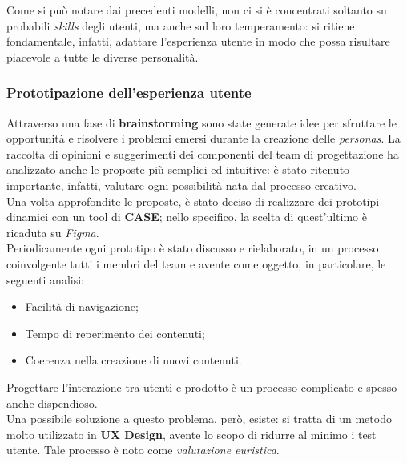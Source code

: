 \documentclass{natourDoc}
\begin{document}
Come si può notare dai precedenti modelli, non ci si è concentrati soltanto su probabili \textit{skills} degli utenti, ma anche sul loro 
temperamento: si ritiene fondamentale, infatti, adattare l'esperienza utente in modo che possa risultare piacevole a tutte le diverse personalità.

\newpage
\subsubsection{Prototipazione dell'esperienza utente}
Attraverso una fase di \textbf{brainstorming} sono state generate idee per sfruttare le opportunità e risolvere i problemi emersi durante la creazione delle \textit{personas}.
La raccolta di opinioni e suggerimenti dei componenti del team di progettazione ha analizzato anche le proposte più semplici ed intuitive: è stato ritenuto importante, infatti, valutare ogni 
possibilità nata dal processo creativo. \\
Una volta approfondite le proposte, è stato deciso di realizzare dei prototipi dinamici con un tool di \textbf{CASE}; nello specifico, la scelta di quest'ultimo è ricaduta su \textit{Figma}.\\

Periodicamente ogni prototipo è stato discusso e rielaborato, in un processo coinvolgente tutti i membri del team e avente come oggetto, in particolare, le seguenti analisi:
\begin{itemize}
	\item Facilità di navigazione;
	\item Tempo di reperimento dei contenuti;
	\item Coerenza nella creazione di nuovi contenuti.
\end{itemize}

Progettare l'interazione tra utenti e prodotto è un processo complicato e spesso anche dispendioso. \\
Una possibile soluzione a questo problema, però, esiste: si tratta di un metodo molto utilizzato in 
\textbf{UX Design}, avente lo scopo di ridurre al minimo i test utente. Tale processo è noto come \textit{valutazione euristica}. \\
\end{document}
